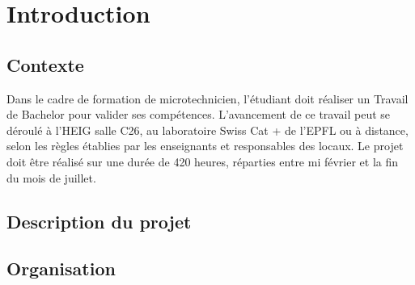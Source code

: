 \section{Introduction}

\subsection{Contexte}
Dans le cadre de formation de microtechnicien, l'étudiant doit réaliser un Travail de Bachelor pour valider ses compétences. L'avancement de ce travail peut se déroulé à l'HEIG salle C26, au laboratoire Swiss Cat + de l'EPFL ou à distance, selon les règles établies par les enseignants et responsables des locaux. Le projet doit être réalisé sur une durée de 420 heures, réparties entre mi février et la fin du mois de juillet.

\subsection{Description du projet}

\subsection{Organisation}


\newpage